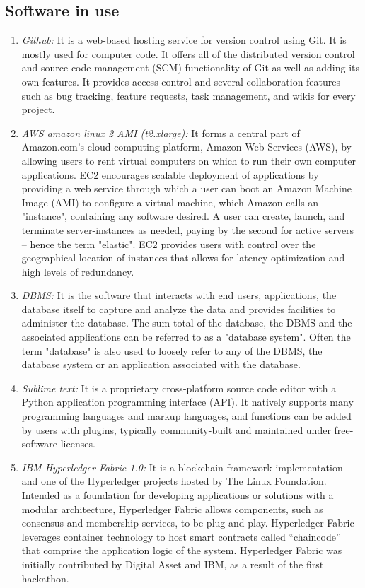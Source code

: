 \documentclass[conference]{IEEEtran}
\begin{document}
\subsection{Software in use}
\begin{enumerate} [font=\itshape]
  \item \textit{Github: } It is a web-based hosting service for version control using Git. It is mostly used for computer code. It offers all of the distributed version control and source code management (SCM) functionality of Git as well as adding its own features. It provides access control and several collaboration features such as bug tracking, feature requests, task management, and wikis for every project.\\
   \item \textit{AWS amazon linux 2 AMI (t2.xlarge): } It forms a central part of Amazon.com's cloud-computing platform, Amazon Web Services (AWS), by allowing users to rent virtual computers on which to run their own computer applications. EC2 encourages scalable deployment of applications by providing a web service through which a user can boot an Amazon Machine Image (AMI) to configure a virtual machine, which Amazon calls an "instance", containing any software desired. A user can create, launch, and terminate server-instances as needed, paying by the second for active servers – hence the term "elastic". EC2 provides users with control over the geographical location of instances that allows for latency optimization and high levels of redundancy. \\
   \item \textit{DBMS: }It is the software that interacts with end users, applications, the database itself to capture and analyze the data and provides facilities to administer the database. The sum total of the database, the DBMS and the associated applications can be referred to as a "database system". Often the term "database" is also used to loosely refer to any of the DBMS, the database system or an application associated with the database.\\
   \item \textit{Sublime text: } It is a proprietary cross-platform source code editor with a Python application programming interface (API). It natively supports many programming languages and markup languages, and functions can be added by users with plugins, typically community-built and maintained under free-software licenses.\\
   \item \textit{IBM Hyperledger Fabric 1.0: }It is a blockchain framework implementation and one of the Hyperledger projects hosted by The Linux Foundation. Intended as a foundation for developing applications or solutions with a modular architecture, Hyperledger Fabric allows components, such as consensus and membership services, to be plug-and-play. Hyperledger Fabric leverages container technology to host smart contracts called “chaincode” that comprise the application logic of the system. Hyperledger Fabric was initially contributed by Digital Asset and IBM, as a result of the first hackathon.\\

\end{enumerate}
\end{document}
